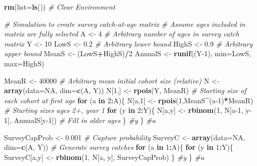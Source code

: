 \documentclass[
]{krantz}
\makeatletter
\newenvironment{Shaded}{\begin{snugshade}}{\end{snugshade}}
\newcommand{\AttributeTok}[1]{\textcolor[rgb]{0.27,0.27,0.27}{#1}}
\newcommand{\CommentTok}[1]{\textcolor[rgb]{0.37,0.37,0.37}{\textit{#1}}}
\newcommand{\ConstantTok}[1]{\textcolor[rgb]{0.37,0.37,0.37}{#1}}
\newcommand{\ControlFlowTok}[1]{\textcolor[rgb]{0.27,0.27,0.27}{\textbf{#1}}}
\newcommand{\DecValTok}[1]{\textcolor[rgb]{0.06,0.06,0.06}{#1}}
\newcommand{\FloatTok}[1]{\textcolor[rgb]{0.06,0.06,0.06}{#1}}
\newcommand{\FunctionTok}[1]{\textcolor[rgb]{0.27,0.27,0.27}{\textbf{#1}}}
\newcommand{\NormalTok}[1]{#1}
\newcommand{\OtherTok}[1]{\textcolor[rgb]{0.37,0.37,0.37}{#1}}
\newcommand{\SpecialCharTok}[1]{\textcolor[rgb]{0.43,0.43,0.43}{\textbf{#1}}}
\newenvironment{kframe}{%
\medskip{}
\setlength{\fboxsep}{.8em}
 \def\at@end@of@kframe{}%
 \ifinner\ifhmode%
  \def\at@end@of@kframe{\end{minipage}}%
  \begin{minipage}{\columnwidth}%
 \fi\fi%
 \def\FrameCommand##1{\hskip\@totalleftmargin \hskip-\fboxsep
 \colorbox{shadecolor}{##1}\hskip-\fboxsep
     \hskip-\linewidth \hskip-\@totalleftmargin \hskip\columnwidth}%
 \MakeFramed {\advance\hsize-\width
   \@totalleftmargin\z@ \linewidth\hsize
   \@setminipage}}%
 {\par\unskip\endMakeFramed%
 \at@end@of@kframe}
\renewenvironment{Shaded}{\begin{kframe}}{\end{kframe}}
\makeatother
\begin{document}
\begin{Shaded}
\begin{Highlighting}[]
\FunctionTok{rm}\NormalTok{(}\AttributeTok{list=}\FunctionTok{ls}\NormalTok{()) }\CommentTok{\# Clear Environment}

\CommentTok{\# Simulation to create survey catch{-}at{-}age matrix}
\CommentTok{\# Assume ages included in matrix are fully selected}
\NormalTok{A }\OtherTok{\textless{}{-}} \DecValTok{4} \CommentTok{\# Arbitrary number of ages in survey catch matrix}
\NormalTok{Y }\OtherTok{\textless{}{-}} \DecValTok{10}
\NormalTok{LowS }\OtherTok{\textless{}{-}} \FloatTok{0.2} \CommentTok{\# Arbitrary lower bound}
\NormalTok{HighS }\OtherTok{\textless{}{-}} \FloatTok{0.9} \CommentTok{\# Arbitrary upper bound}
\NormalTok{MeanS }\OtherTok{\textless{}{-}}\NormalTok{ (LowS}\SpecialCharTok{+}\NormalTok{HighS)}\SpecialCharTok{/}\DecValTok{2}
\NormalTok{AnnualS }\OtherTok{\textless{}{-}} \FunctionTok{runif}\NormalTok{((Y}\DecValTok{{-}1}\NormalTok{), }\AttributeTok{min=}\NormalTok{LowS, }\AttributeTok{max=}\NormalTok{HighS)}

\NormalTok{MeanR }\OtherTok{\textless{}{-}} \DecValTok{40000} \CommentTok{\# Arbitrary mean initial cohort size (relative)}
\NormalTok{N }\OtherTok{\textless{}{-}} \FunctionTok{array}\NormalTok{(}\AttributeTok{data=}\ConstantTok{NA}\NormalTok{, }\AttributeTok{dim=}\FunctionTok{c}\NormalTok{(A, Y))}
\NormalTok{N[}\DecValTok{1}\NormalTok{,] }\OtherTok{\textless{}{-}} \FunctionTok{rpois}\NormalTok{(Y, MeanR) }\CommentTok{\# Starting size of each cohort at first age}
\ControlFlowTok{for}\NormalTok{ (a }\ControlFlowTok{in} \DecValTok{2}\SpecialCharTok{:}\NormalTok{A)\{}
\NormalTok{  N[a,}\DecValTok{1}\NormalTok{] }\OtherTok{\textless{}{-}} \FunctionTok{rpois}\NormalTok{(}\DecValTok{1}\NormalTok{,MeanS}\SpecialCharTok{\^{}}\NormalTok{(a}\DecValTok{{-}1}\NormalTok{)}\SpecialCharTok{*}\NormalTok{MeanR) }\CommentTok{\# Starting sizes ages 2+, year 1}
  \ControlFlowTok{for}\NormalTok{ (y }\ControlFlowTok{in} \DecValTok{2}\SpecialCharTok{:}\NormalTok{Y)\{}
\NormalTok{    N[a,y] }\OtherTok{\textless{}{-}} \FunctionTok{rbinom}\NormalTok{(}\DecValTok{1}\NormalTok{, N[a}\DecValTok{{-}1}\NormalTok{, y}\DecValTok{{-}1}\NormalTok{], AnnualS[y}\DecValTok{{-}1}\NormalTok{]) }\CommentTok{\# Fill in older ages}
\NormalTok{    \} }\CommentTok{\#y}
\NormalTok{  \} }\CommentTok{\#a}

\NormalTok{SurveyCapProb }\OtherTok{\textless{}{-}} \FloatTok{0.001} \CommentTok{\# Capture probability}
\NormalTok{SurveyC }\OtherTok{\textless{}{-}} \FunctionTok{array}\NormalTok{(}\AttributeTok{data=}\ConstantTok{NA}\NormalTok{, }\AttributeTok{dim=}\FunctionTok{c}\NormalTok{(A, Y))}
\CommentTok{\# Generate survey catches}
\ControlFlowTok{for}\NormalTok{ (a }\ControlFlowTok{in} \DecValTok{1}\SpecialCharTok{:}\NormalTok{A)\{}
  \ControlFlowTok{for}\NormalTok{ (y }\ControlFlowTok{in} \DecValTok{1}\SpecialCharTok{:}\NormalTok{Y)\{}
\NormalTok{    SurveyC[a,y] }\OtherTok{\textless{}{-}} \FunctionTok{rbinom}\NormalTok{(}\DecValTok{1}\NormalTok{, N[a, y], SurveyCapProb)}
\NormalTok{  \} }\CommentTok{\#y}
\NormalTok{\} }\CommentTok{\#a}
\end{Highlighting}
\end{Shaded}
\end{document}

